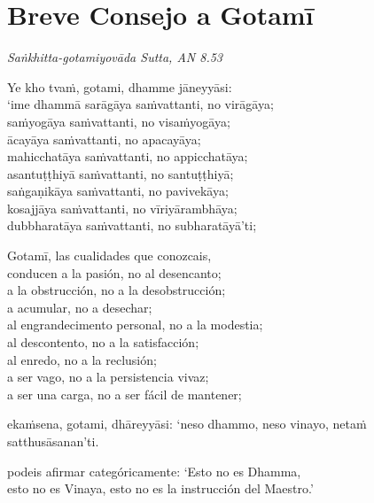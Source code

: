 \chapter[Breve Consejo a Gotamī]{Breve Consejo a Gotamī}

\emph{Saṅkhitta-gotamiyovāda Sutta, AN 8.53}


\begin{leader}
\end{leader}

Ye kho tvaṁ, gotami, dhamme jāneyyāsi:\\
‘ime dhammā sarāgāya saṁvattanti, no virāgāya;\\
saṁyogāya saṁvattanti, no visaṁyogāya;\\
ācayāya saṁvattanti, no apacayāya;\\
mahicchatāya saṁvattanti, no appicchatāya;\\
asantuṭṭhiyā saṁvattanti, no santuṭṭhiyā;\\
saṅgaṇikāya saṁvattanti, no pavivekāya;\\
kosajjāya saṁvattanti, no vīriyārambhāya;\\
dubbharatāya saṁvattanti, no subharatāyā’ti;

\begin{english}
  Gotamī, las cualidades que conozcais,\\
  conducen a la pasión, no al desencanto;\\
  a la obstrucción, no a la desobstrucción;\\
  a acumular, no a desechar;\\
  al engrandecimento personal, no a la modestia;\\
  al descontento, no a la satisfacción;\\
  al enredo, no a la reclusión;\\
  a ser vago, no a la persistencia vivaz;\\
  a ser una carga, no a ser fácil de mantener;
\end{english}

ekaṁsena, gotami, dhāreyyāsi: ‘neso dhammo, neso vinayo, netaṁ satthusāsanan’ti.

\begin{english}
  podeis afirmar categóricamente: ‘Esto no es Dhamma,\\
  esto no es Vinaya, esto no es la instrucción del Maestro.’
\end{english}

